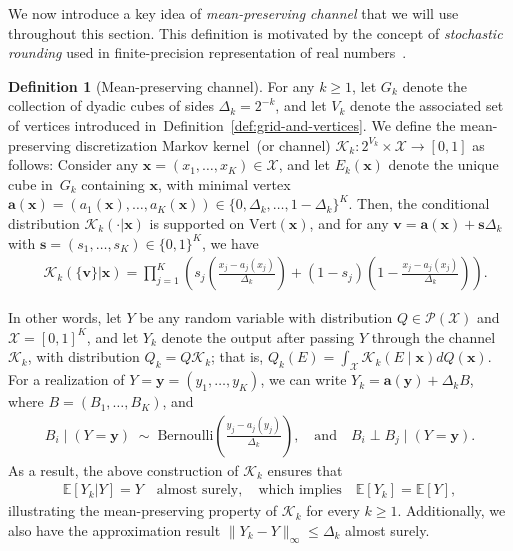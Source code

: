 \documentclass{article}
\theoremstyle{plain}
\theoremstyle{definition}
\newtheorem{definition}[definition]{Definition}
\newcommand{\lrp}[1]{\left( #1 \right)}
\newcommand{\calP}{\mathcal P}
\newcommand{\calX}{\mathcal X}
\newcommand{\calK}{\mathcal{K}}
\newcommand{\avec}{\mathbf{a}}
\newcommand{\svec}{\mathbf{s}}
\newcommand{\vvec}{\mathbf{v}}
\newcommand{\xvec}{\mathbf{x}}
\newcommand{\yvec}{\mathbf{y}}
\newcommand{\qtext}[1]{\quad \text{#1} \quad}
\newcommand{\Vertices}{\mathrm{Vert}}
\begin{document}
 We now introduce a key idea of \emph{mean-preserving channel} that we will use throughout this section. This definition is motivated by the concept of \emph{stochastic rounding} used in finite-precision representation of real numbers~\citep{croci2022stochastic}. 
 
\begin{definition}[Mean-preserving channel]
    \label{def:mean-preserving-channel}
    For any $k \geq 1$, let $G_k$ denote the collection of dyadic cubes of sides $\Delta_k = 2^{-k}$, and let $V_k$ denote the associated set of vertices introduced in~Definition~\ref{def:grid-and-vertices}. 
    We define the mean-preserving discretization Markov kernel~(or channel) $\calK_k:2^{V_k} \times \calX \to [0,1]$ as follows: Consider any $\xvec = (x_1, \ldots, x_K) \in \calX$, and let  $E_k(\xvec)$ denote the unique cube in~$G_k$ containing $\xvec$, with minimal vertex $\avec(\xvec) = (a_1(\xvec),\ldots, a_K(\xvec)) \in \{0, \Delta_k, \ldots, 1-\Delta_k\}^K$. Then, the conditional distribution $\calK_k(\cdot|\xvec)$ is supported on $\Vertices(\xvec)$, and for any $\vvec = \avec(\xvec) + \svec \Delta_k$ with $\svec = (s_1, \ldots, s_K) \in \{0,1\}^K$, we have 
    \begin{align}
        &\calK_k(\{\vvec\}|\xvec)  = \prod_{j=1}^K\lrp{ s_j\lrp{ \frac{x_j - a_j(x_j)}{\Delta_k} }  + (1-s_j) \lrp{ 1 -\frac{x_j - a_j(x_j)}{\Delta_k} } }. 
    \end{align}
\end{definition}
In other words, let $Y$ be any random variable with distribution $Q \in \calP(\calX)$ and $\calX = [0,1]^K$, and let $Y_k$ denote the output after passing $Y$ through the channel $\calK_k$, with distribution $Q_k = Q \calK_k$; that is, $Q_k(E) = \int_{\calX} \calK_k(E \mid \xvec) dQ(\xvec)$. For  a realization of $Y = \yvec = (y_1, \ldots, y_K)$, we can write $Y_k = \avec(\yvec) + \Delta_k B$, where $B = (B_1, \ldots, B_K)$, and 
\begin{align}
    B_i \mid (Y = \yvec) \; \sim \; \mathrm{Bernoulli}\lrp{ \frac{y_j-a_j(y_j)}{\Delta_k}}, \qtext{and} B_i \perp B_j \mid (Y=\yvec). 
\end{align}
As a result, the above construction of $\calK_k$ ensures that 
\begin{align}
    \mathbb{E}[Y_k|Y] = Y \quad \text{almost surely}, \qtext{which implies} \mathbb{E}[Y_k] = \mathbb{E}[Y],  
\end{align}
illustrating the mean-preserving property of $\calK_k$ for every $k \geq 1$. Additionally, we also have the approximation result $\|Y_k - Y\|_\infty \leq \Delta_k$ almost surely. 
\end{document}
